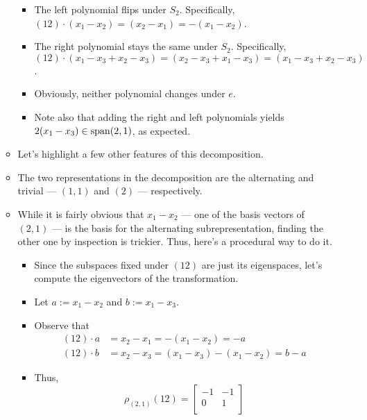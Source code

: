 \documentclass[../notes.tex]{subfiles}
\begin{document}
\begin{itemize}
\begin{itemize}
\begin{equation*}
        \end{equation*}
        \begin{itemize}
            \item The left polynomial flips under $S_2$. Specifically, $(12)\cdot(x_1-x_2)=(x_2-x_1)=-(x_1-x_2)$.
            \item The right polynomial stays the same under $S_2$. Specifically, $(12)\cdot(x_1-x_3+x_2-x_3)=(x_2-x_3+x_1-x_3)=(x_1-x_3+x_2-x_3)$.
            \item Obviously, neither polynomial changes under $e$.
            \item Note also that adding the right and left polynomials yields $2(x_1-x_3)\in\operatorname{span}(2,1)$, as expected.
        \end{itemize}
        \item Let's highlight a few other features of this decomposition.
        \item The two representations in the decomposition are the alternating and trivial --- $(1,1)$ and $(2)$ --- respectively.
        \item While it is fairly obvious that $x_1-x_2$ --- one of the basis vectors of $(2,1)$ --- is the basis for the alternating subrepresentation, finding the other one by inspection is trickier. Thus, here's a procedural way to do it.
        \begin{itemize}
            \item Since the subspaces fixed under $(12)$ are just its eigenspaces, let's compute the eigenvectors of the transformation.
            \item Let $a:=x_1-x_2$ and $b:=x_1-x_3$.
            \item Observe that
            \begin{align*}
                (12)\cdot a &= x_2-x_1 = -(x_1-x_2) = -a\\
                (12)\cdot b &= x_2-x_3 = (x_1-x_3)-(x_1-x_2) = b-a
            \end{align*}
            \item Thus,
            \begin{equation*}
                \rho_{(2,1)}(12) =
                \begin{bmatrix}
                    -1 & -1\\
                    0 & 1\\
                \end{bmatrix}
            \end{equation*}
            \begin{itemize}

\end{itemize}
\end{itemize}
\end{itemize}
\end{itemize}
\end{document}
